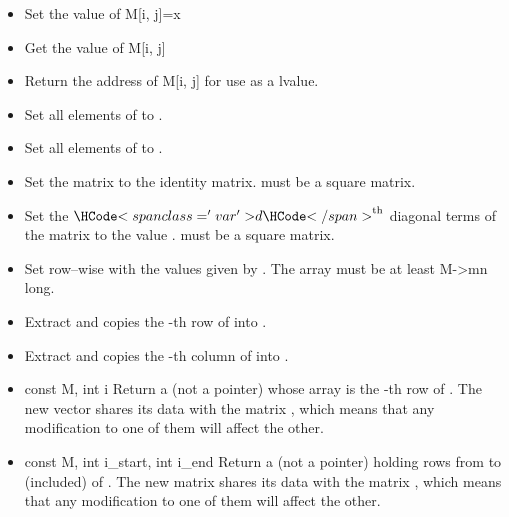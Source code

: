 \begin{itemize}
\item {}
  \sshortdescribe Set the value of M[i, j]=x  

\item {}
  \sshortdescribe Get the value of M[i, j]  

\item {}
  \sshortdescribe Return the address of M[i, j] for use as a lvalue.

\item {}
  \sshortdescribe Set all elements of  to .
\item {}
  \sshortdescribe Set all elements of  to .
  
\item {}
  \sshortdescribe Set the matrix  to the identity
  matrix.  must be a square matrix.

\item {}
  \sshortdescribe Set the $\var{d}^{\text{th}}$ diagonal terms of the matrix
   to the value .  must be a square matrix.
\item {}
  \sshortdescribe Set  row--wise with the values given by . The
  array  must be at least M->mn long.
\item {}
  \sshortdescribe Extract and copies the -th row of  into
  .

\item {}
  \sshortdescribe Extract and copies the -th column of  into .
  
\item {}
  {const \PnlMat \ptr M, int i}
  \sshortdescribe Return a \PnlVect (not a pointer) whose array is
  the -th row of . The new vector shares its data with the
  matrix , which means that any modification to one of them will affect
  the other.
\item {}
  {const \PnlMat \ptr M, int i_start, int i_end}
  \sshortdescribe Return a \PnlMat (not a pointer) holding rows from
   to  (included) of .
  The new matrix shares its data with the
  matrix , which means that any modification to one of them will affect
  the other.
  

\end{itemize}
